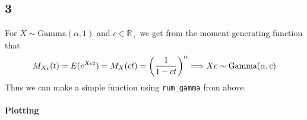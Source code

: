 \documentclass[
]{article}
\newenvironment{Shaded}{\begin{snugshade}}{\end{snugshade}}
\newcommand{\AttributeTok}[1]{\textcolor[rgb]{0.77,0.63,0.00}{#1}}
\newcommand{\ControlFlowTok}[1]{\textcolor[rgb]{0.13,0.29,0.53}{\textbf{#1}}}
\newcommand{\DecValTok}[1]{\textcolor[rgb]{0.00,0.00,0.81}{#1}}
\newcommand{\FunctionTok}[1]{\textcolor[rgb]{0.00,0.00,0.00}{#1}}
\newcommand{\NormalTok}[1]{#1}
\newcommand{\OtherTok}[1]{\textcolor[rgb]{0.56,0.35,0.01}{#1}}
\newcommand{\SpecialCharTok}[1]{\textcolor[rgb]{0.00,0.00,0.00}{#1}}
\begin{document}
\hypertarget{section-4}{%
\subsection{3}\label{section-4}}

For \(X \sim \text{Gamma}(\alpha, 1)\) and \(c \in \mathbb{R}_+\) we get
from the moment generating function that \[
M_{Xc}(t) = E(e^{Xct}) = M_X(ct) = \bigg{(}\frac{1}{1-ct}\bigg{)}^\alpha \\
\Longrightarrow Xc \sim \text{Gamma}(\alpha, c)
\] Thus we can make a simple function using \texttt{rum\_gamma} from
above.

\begin{Shaded}
\end{Shaded}

\hypertarget{plotting}{%
\paragraph{Plotting}\label{plotting}}
\end{document}
